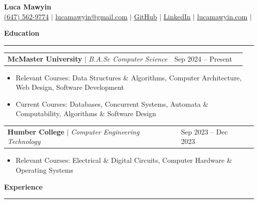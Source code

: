 \documentclass[letterpaper]{article}
\newcommand{\ressection}[1]{
    \vspace{1.0em}
    \noindent\textbf{\large #1}
    \par\vspace{0.3em}
    \hrule
    \vspace{0.6em}
}
\begin{document}
\begin{center}
    {\Huge \textbf{Luca Mawyin}} \\[1em]
    \href{tel:+16475629774}{(647) 562-9774} $|$
    \href{mailto:lucamawyin@gmail.com}{lucamawyin@gmail.com} $|$
    \href{https://github.com/LucaMawyin}{GitHub} $|$
    \href{https://www.linkedin.com/in/lucamawyin/}{LinkedIn} $|$
    \href{https://lucamawyin.com}{lucamawyin.com} $|$
\end{center}

\ressection{Education}

\begin{tabularx}{\textwidth}{X l r}
    \textbf{McMaster University} $|$ \textit{B.A.Sc Computer Science} & Sep 2024 -- Present \\
\end{tabularx}

\vspace{-0.5em}

\begin{itemize}[ leftmargin=2.5em, itemsep=-0.2em ]
    \item \parbox[t]{\dimexpr\linewidth-2.5em}{Relevant Courses: Data Structures \& Algorithms, Computer Architecture, Web Design, Software Development}
    \item Current Courses: Databases, Concurrent Systems, Automata \& Computability, Algorithms \& Software Design
\end{itemize}

\vspace{-0.5em}

\begin{tabularx}{\textwidth}{X l r}
    \textbf{Humber College} $|$ \textit{Computer Engineering Technology} & Sep 2023 -- Dec 2023 \\
\end{tabularx}

\vspace{-0.5em}

\begin{itemize}[ leftmargin=2.5em, itemsep=-0.2em ]
    \item \parbox[t]{\dimexpr\linewidth-2.5em}{Relevant Courses: Electrical \& Digital Circuits, Computer Hardware \& Operating Systems}
\end{itemize}

\ressection{Experience}
\end{document}
